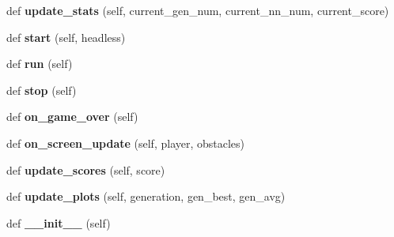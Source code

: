 \begin{DoxyCompactItemize}
\item 
def {\bfseries update\+\_\+stats} (self, current\+\_\+gen\+\_\+num, current\+\_\+nn\+\_\+num, current\+\_\+score)\hypertarget{classMachineGamingWindow_1_1MachineGaming_a04ab71cba412f5717ebaff5c9ca12346}{}\label{classMachineGamingWindow_1_1MachineGaming_a04ab71cba412f5717ebaff5c9ca12346}

\item 
def {\bfseries start} (self, headless)\hypertarget{classMachineGamingWindow_1_1MachineGaming_a3a9714707ad07433db600a5145064fd0}{}\label{classMachineGamingWindow_1_1MachineGaming_a3a9714707ad07433db600a5145064fd0}

\item 
def {\bfseries run} (self)\hypertarget{classMachineGamingWindow_1_1MachineGaming_ac0eca50403df7de38c5d8161fbf04149}{}\label{classMachineGamingWindow_1_1MachineGaming_ac0eca50403df7de38c5d8161fbf04149}

\item 
def {\bfseries stop} (self)\hypertarget{classMachineGamingWindow_1_1MachineGaming_afd9e154143823d295e878d44361fd497}{}\label{classMachineGamingWindow_1_1MachineGaming_afd9e154143823d295e878d44361fd497}

\item 
def {\bfseries on\+\_\+game\+\_\+over} (self)\hypertarget{classMachineGamingWindow_1_1MachineGaming_a9ad321b2297209ff8076f09ae36562be}{}\label{classMachineGamingWindow_1_1MachineGaming_a9ad321b2297209ff8076f09ae36562be}

\item 
def {\bfseries on\+\_\+screen\+\_\+update} (self, player, obstacles)\hypertarget{classMachineGamingWindow_1_1MachineGaming_a6c1acafb87b7e21c1ec900c0b38d3a00}{}\label{classMachineGamingWindow_1_1MachineGaming_a6c1acafb87b7e21c1ec900c0b38d3a00}

\item 
def {\bfseries update\+\_\+scores} (self, score)\hypertarget{classMachineGamingWindow_1_1MachineGaming_ac95f57eab962f80004940192d8b28f72}{}\label{classMachineGamingWindow_1_1MachineGaming_ac95f57eab962f80004940192d8b28f72}

\item 
def {\bfseries update\+\_\+plots} (self, generation, gen\+\_\+best, gen\+\_\+avg)\hypertarget{classMachineGamingWindow_1_1MachineGaming_ae511bee73c8661920e513fac8204e5de}{}\label{classMachineGamingWindow_1_1MachineGaming_ae511bee73c8661920e513fac8204e5de}

\item 
def {\bfseries \+\_\+\+\_\+init\+\_\+\+\_\+} (self)\hypertarget{classMachineGamingWindow_1_1MachineGaming_a26fd9cbef133647a736cc58fe0b792d4}{}\label{classMachineGamingWindow_1_1MachineGaming_a26fd9cbef133647a736cc58fe0b792d4}


\end{DoxyCompactItemize}
